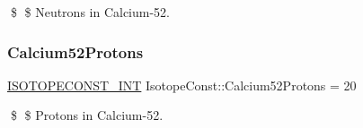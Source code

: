 \$ \$ Neutrons in Calcium-\/52. \mbox{\label{group___isotope_const-_calcium-_ca52_ga8b0b69cbf314a9fefe57135f71e13db7}} 
\subsubsection{\texorpdfstring{Calcium52\+Protons}{Calcium52Protons}}
{\footnotesize\ttfamily \mbox{\hyperlink{group___isotope_const-_macros_ga5f18360b3e99483a35c32d789e62621c}{I\+S\+O\+T\+O\+P\+E\+C\+O\+N\+S\+T\+\_\+\+I\+NT}} Isotope\+Const\+::\+Calcium52\+Protons = 20}

\$ \$ Protons in Calcium-\/52. 